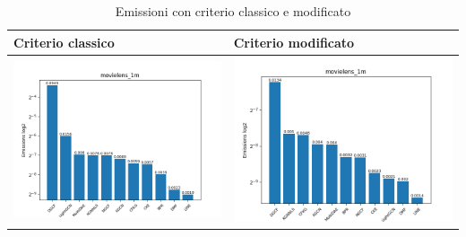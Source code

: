 \begin{table}[H]
    \centering
    \footnotesize
    \setlength\tabcolsep{0pt}
    \begin{tabularx}{\textwidth}{|X|X|}
        \hline
        \textbf{Criterio classico} & \textbf{Criterio modificato} \\
        \hline
        \includegraphics[width=\linewidth, trim=0 0 0 0]{images/emissions_movielens_1m_30_7_earlyClassic.png} &
        \includegraphics[width=\linewidth, trim=0 0 0 0]{images/emissions_movielens_1m_30_7_earlyModified.png} \\
        \hline
    \end{tabularx}
    \caption{Emissioni con criterio classico e modificato}
    \label{tab:emissions_info}
\end{table}



